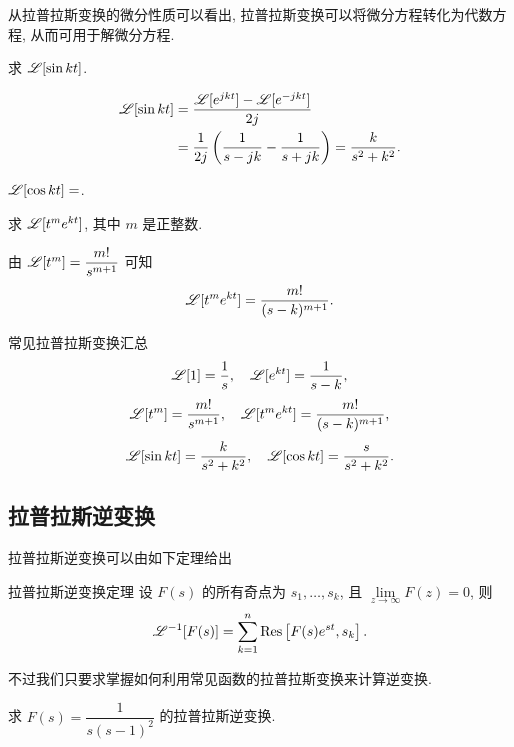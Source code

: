 从拉普拉斯变换的微分性质可以看出, 拉普拉斯变换可以将微分方程转化为代数方程, 从而可用于解微分方程.

\begin{example}
	求 $\mathscr{L}[\sin{kt}]$.
\end{example}

\begin{solution}
	\begin{align*}
		\mathscr{L}[\sin{kt}]&=\frac{\mathscr{L}[e^{jkt}]-\mathscr{L}[e^{-jkt}]}{2j}\\
		&=\frac1{2j}\left(\frac1{s-jk}-\frac1{s+jk}\right)
			=\frac k{s^2+k^2}.
	\end{align*}
\end{solution}

\begin{exercise}
	$\mathscr{L}[\cos{kt}]=$.
\end{exercise}

\begin{example}
	求 $\mathscr{L}[t^me^{kt}]$, 其中 $m$ 是正整数.
\end{example}

\begin{solution}
	由 $\mathscr{L}[t^m]=\dfrac{m!}{s^{m+1}}$ 可知
	\[\mathscr{L}[t^me^{kt}]=\frac{m!}{(s-k)^{m+1}}.\]
\end{solution}

\begin{alertblock}{常见拉普拉斯变换汇总}
	\[\mathscr{L}[1]=\frac1s,\quad \mathscr{L}[e^{kt}]=\frac1{s-k},\]
	\[\mathscr{L}[t^m]=\frac{m!}{s^{m+1}},\quad \mathscr{L}[t^me^{kt}]=\frac{m!}{(s-k)^{m+1}},\]
	\[\mathscr{L}[\sin kt]=\frac{k}{s^2+k^2},\quad
	\mathscr{L}[\cos kt]=\frac{s}{s^2+k^2}.\]
\end{alertblock}

\subsection{拉普拉斯逆变换}

拉普拉斯逆变换可以由如下定理给出
\begin{block}{拉普拉斯逆变换定理}
	设 $F(s)$ 的所有奇点为 $s_1,\dots,s_k$, 且 $\lim\limits_{z\to\infty}F(z)=0$, 则
	\[\mathscr{L}^{-1}[F(s)]=\sum_{k=1}^n {\mathrm{Res}}\left[F(s)e^{st},s_k\right].\]
\end{block}

不过我们只要求掌握如何利用常见函数的拉普拉斯变换来计算逆变换.

\begin{example}
	求 $F(s)=\dfrac1{s(s-1)^2}$ 的拉普拉斯逆变换.
\end{example}

